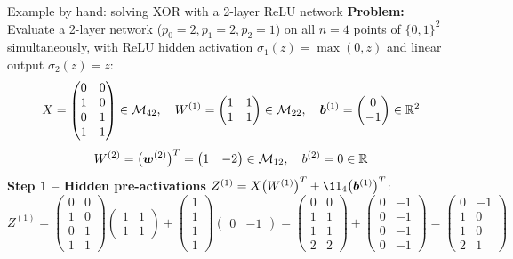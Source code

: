 \documentclass[aspectratio=169]{beamer}\usepackage[]{graphicx}\usepackage[]{xcolor}
\begin{document}
\begin{frame}{Example by hand: solving XOR with a 2-layer ReLU network}
\textbf{Problem:} Evaluate a 2-layer network ($p_0 = 2, p_1 = 2, p_2 = 1$) on all $n = 4$ points of $\{0,1\}^2$ simultaneously, with ReLU hidden activation $\sigma_1(z) = \max(0, z)$ and linear output $\sigma_2(z) = z$:
\[
X = \begin{pmatrix} 0 & 0 \\ 1 & 0 \\ 0 & 1 \\ 1 & 1 \end{pmatrix} \in \mathcal{M}_{42}, \quad
W^{(1)} = \begin{pmatrix} 1 & 1 \\ 1 & 1 \end{pmatrix} \in \mathcal{M}_{22}, \quad
\bm{b}^{(1)} = \begin{pmatrix} 0 \\ -1 \end{pmatrix} \in \mathbb{R}^2
\]
\[
W^{(2)} = \big(\bm{w}^{(2)}\big)^T = \begin{pmatrix} 1 & -2 \end{pmatrix} \in \mathcal{M}_{12}, \quad
b^{(2)} = 0 \in \mathbb{R}
\]
\vfill
\textbf{Step 1 -- Hidden pre-activations} $Z^{(1)} = X \big(W^{(1)}\big)^T + \11_4 \big(\bb^{(1)}\big)^T$:
\[
Z^{(1)} =
\begin{pmatrix} 0 & 0 \\ 1 & 0 \\ 0 & 1 \\ 1 & 1 \end{pmatrix}
\begin{pmatrix} 1 & 1 \\ 1 & 1 \end{pmatrix}
+
\begin{pmatrix} 1 \\ 1 \\ 1 \\ 1 \end{pmatrix}
\begin{pmatrix} 0 & -1 \end{pmatrix}
=
\begin{pmatrix} 0 & 0 \\ 1 & 1 \\ 1 & 1 \\ 2 & 2 \end{pmatrix}
+
\begin{pmatrix} 0 & -1 \\ 0 & -1 \\ 0 & -1 \\ 0 & -1 \end{pmatrix}
=
\begin{pmatrix} 0 & -1 \\ 1 & 0 \\ 1 & 0 \\ 2 & 1 \end{pmatrix}
\]
\end{frame}
\end{document}
